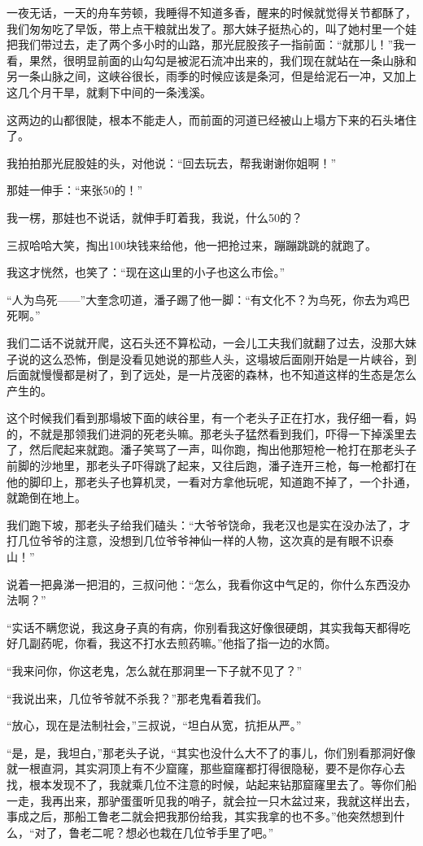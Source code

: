 一夜无话，一天的舟车劳顿，我睡得不知道多香，醒来的时候就觉得关节都酥了，我们匆匆吃了早饭，带上点干粮就出发了。那大妹子挺热心的，叫了她村里一个娃把我们带过去，走了两个多小时的山路，那光屁股孩子一指前面：“就那儿！”我一看，果然，很明显前面的山勾勾是被泥石流冲出来的，我们现在就站在一条山脉和另一条山脉之间，这峡谷很长，雨季的时候应该是条河，但是给泥石一冲，又加上这几个月干旱，就剩下中间的一条浅溪。

这两边的山都很陡，根本不能走人，而前面的河道已经被山上塌方下来的石头堵住了。

我拍拍那光屁股娃的头，对他说：“回去玩去，帮我谢谢你姐啊！”

那娃一伸手：“来张50的！”

我一楞，那娃也不说话，就伸手盯着我，我说，什么50的？

三叔哈哈大笑，掏出100块钱来给他，他一把抢过来，蹦蹦跳跳的就跑了。

我这才恍然，也笑了：“现在这山里的小子也这么市侩。”

“人为鸟死——”大奎念叨道，潘子踢了他一脚：“有文化不？为鸟死，你去为鸡巴死啊。”

我们二话不说就开爬，这石头还不算松动，一会儿工夫我们就翻了过去，没那大妹子说的这么恐怖，倒是没看见她说的那些人头，这塌坡后面刚开始是一片峡谷，到后面就慢慢都是树了，到了远处，是一片茂密的森林，也不知道这样的生态是怎么产生的。

这个时候我们看到那塌坡下面的峡谷里，有一个老头子正在打水，我仔细一看，妈的，不就是那领我们进洞的死老头嘛。那老头子猛然看到我们，吓得一下掉溪里去了，然后爬起来就跑。潘子笑骂了一声，叫你跑，掏出他那短枪一枪打在那老头子前脚的沙地里，那老头子吓得跳了起来，又往后跑，潘子连开三枪，每一枪都打在他的脚印上，那老头子也算机灵，一看对方拿他玩呢，知道跑不掉了，一个扑通，就跪倒在地上。

我们跑下坡，那老头子给我们磕头：“大爷爷饶命，我老汉也是实在没办法了，才打几位爷爷的注意，没想到几位爷爷神仙一样的人物，这次真的是有眼不识泰山！”

说着一把鼻涕一把泪的，三叔问他：“怎么，我看你这中气足的，你什么东西没办法啊？”

“实话不瞒您说，我这身子真的有病，你别看我这好像很硬朗，其实我每天都得吃好几副药呢，你看，我这不打水去煎药嘛。”他指了指一边的水筒。

“我来问你，你这老鬼，怎么就在那洞里一下子就不见了？”

“我说出来，几位爷爷就不杀我？”那老鬼看着我们。

“放心，现在是法制社会，”三叔说，“坦白从宽，抗拒从严。”

“是，是，我坦白，”那老头子说，“其实也没什么大不了的事儿，你们别看那洞好像就一根直洞，其实洞顶上有不少窟窿，那些窟窿都打得很隐秘，要不是你存心去找，根本发现不了，我就乘几位不注意的时候，站起来钻那窟窿里去了。等你们船一走，我再出来，那驴蛋蛋听见我的哨子，就会拉一只木盆过来，我就这样出去，事成之后，那船工鲁老二就会把我那份给我，其实我拿的也不多。”他突然想到什么，“对了，鲁老二呢？想必也栽在几位爷手里了吧。”

